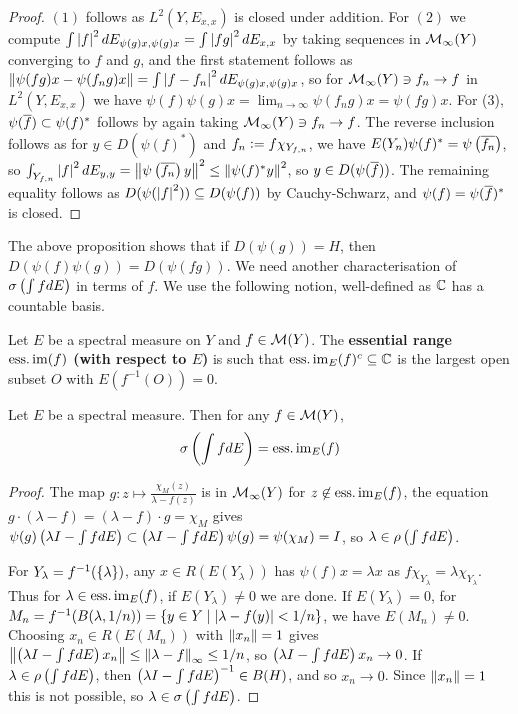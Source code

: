 \documentclass[10pt]{amsart}
\begin{document}
\begin{proof}
    $(1)$ follows as $L^2(Y, E_{x, x})$ is closed under addition. For $(2)$ we compute $\int\left| f \right|^2 dE_{\psi(g)x, \psi(g)x} = \int\left| fg \right|^2 dE_{x, x}$ by taking sequences in $\mathcal{M}_\infty(Y)$ converging to $f$ and $g$, and the first statement follows as $\left\| \psi(fg)x - \psi(f_ng)x \right\| = \int\left| f - f_n \right|^2dE_{\psi(g)x, \psi(g)x}$, so for $\mathcal{M}_\infty(Y) \ni f_n \to f$ in $L^2(Y, E_{x, x})$ we have $\psi(f)\psi(g)x = \lim_{n \to \infty}\psi(f_n g)x = \psi(fg)x$. For (3), $\psi(\overline{f}) \subset \psi(f)^*$ follows by again taking $\mathcal{M}_\infty(Y) \ni f_n \to f$. The reverse inclusion follows as for $y \in D(\psi(f)^*)$ and $f_n \vcentcolon= f\chi_{Y_{f, n}}$, we have $E(Y_n)\psi(f)^* = \psi\left(  \overline{f_n}  \right)$, so $\int_{Y_{f, n}}\left| f \right|^2 dE_{y, y} = \left\| \psi\left(  \overline{f_n}  \right)y \right\|^2 \leq \left\| \psi(f)^*y \right\|^2$, so $y \in D(\psi(\overline{f}))$. The remaining equality follows as $D(\psi(\left| f \right|^2)) \subseteq D(\psi(f))$ by Cauchy-Schwarz, and $\psi(f) = \psi(\overline{f})^*$ is closed.
\end{proof}
The above proposition shows that if $D(\psi(g)) = H$, then $D(\psi(f)\psi(g)) = D(\psi(fg))$. We need another characterisation of $\sigma\left(  \int f dE  \right)$ in terms of $f$. We use the following notion, well-defined as $\mathbb{C}$ has a countable basis.
\begin{definition}
    Let $E$ be a spectral measure on $Y$ and $f \in \mathcal{M}(Y)$. The \textbf{essential range $\operatorname{ess.im}(f)$ (with respect to $E$)} is such that $\operatorname{ess.im}_E(f)^c \subseteq \mathbb{C}$ is the largest open subset $O$ with $E(f^{-1}(O)) = 0$.
\end{definition} %
\begin{proposition}\label{essimspec} %
    Let $E$ be a spectral measure. Then for any $f \in \mathcal{M}(Y)$,
    $$
        \sigma\left(  \int f dE  \right) = \operatorname{ess.im}_E(f)
    $$
\end{proposition}
\begin{proof}
    The map $g : z \mapsto \frac{\chi_M(z)}{\lambda - f(z)}$ is in $\mathcal{M}_\infty(Y)$ for $z \not\in \operatorname{ess.im}_E(f)$, the equation $g \cdot (\lambda - f) = (\lambda - f) \cdot g = \chi_M$ gives $\psi(g)\left(  \lambda I - \int f dE  \right) \subset \left(  \lambda I - \int f dE  \right)\psi(g) = \psi(\chi_M) = I$, so $\lambda \in \rho\left(  \int f dE  \right)$. 
    
    For $Y_\lambda = f^{-1}(\left\{  \lambda  \right\})$, any $x \in R(E(Y_\lambda))$ has $\psi(f)x = \lambda x$ as $f\chi_{Y_\lambda} = \lambda\chi_{Y_\lambda}$. Thus for $\lambda \in \operatorname{ess.im}_E(f)$, if $E(Y_\lambda) \neq 0$ we are done. If $E(Y_\lambda) = 0$, for $M_n = f^{-1}(B(\lambda, 1/n)) = \left\{  y \in Y \mid \left| \lambda - f(y) \right| < 1/n  \right\}$, we have $E(M_n) \neq 0$. Choosing $x_n \in R(E(M_n))$ with $\left\| x_n \right\| = 1$ gives $\left\| \left(  \lambda I - \int f dE  \right) x_n \right\| \leq \left\| \lambda - f \right\|_\infty \leq 1/n$, so $\left(  \lambda I - \int f dE  \right)x_n \to 0$. If $\lambda \in \rho\left(  \int f dE  \right)$, then $\left(  \lambda I - \int f dE  \right)^{-1} \in B(H)$, and so $x_n \to 0$. Since $\left\| x_n \right\| = 1$ this is not possible, so $\lambda \in \sigma\left(  \int f dE  \right)$.
\end{proof}
\end{document}
